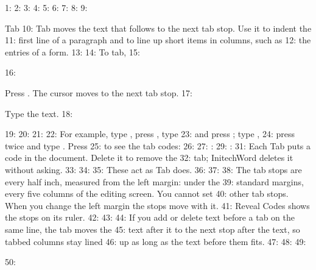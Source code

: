 1: %
2: %
3: %
4: %
5: %
6: %
7: %
8: 
9: \begin{Feature}{Tab}
10: Tab moves the text that follows to the next tab stop.  Use it to indent the
11: first line of a paragraph and to line up short items in columns, such as
12: the entries of a form.
13: 
14: To tab,
15: \begin{WPSteps}
16: \item Press .  The cursor moves to the next tab stop.
17: \item Type the text.
18: \end{WPSteps}
19: 
20: 
21: 
22: For example, type , press , type
23:  and press ; type ,
24: press  twice and type .  Press
25:  to see the tab codes:
26: 
27: : 
29: : 
31: Each Tab puts a \Code{[Tab]} code in the document.  Delete it to remove the
32: tab; InitechWord deletes it without asking.
33: 
34: 
35: These act as Tab does.
36: 
37: 
38: The tab stops are every half inch, measured from the left margin: under the
39: standard margins, every five columns of the editing screen.  You cannot set
40: other tab stops.  When you change the left margin the stops move with it.
41: Reveal Codes shows the stops on its ruler.
42: 
43: 
44: If you add or delete text before a tab on the same line, the tab moves the
45: text after it to the next stop after the text, so tabbed columns stay lined
46: up as long as the text before them fits.
47: 
48: 
49: \end{Feature}
50: 
